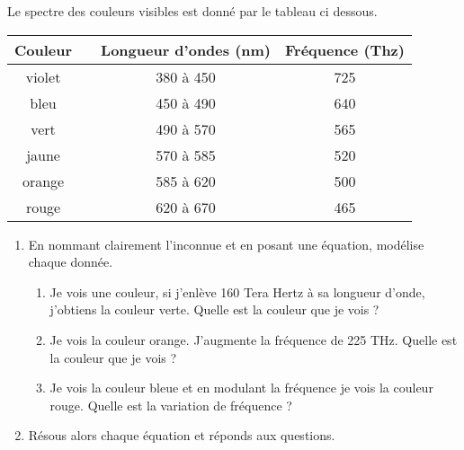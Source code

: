 
Le spectre des couleurs visibles est donné par le tableau ci dessous.

\begin{center}
\begin{tabular}{|c|c|c|c|}
\hline 
Couleur &  & Longueur d'ondes (nm) & Fréquence (Thz)\\ 
\hline 
violet & \cellcolor{purple} & 380 à 450   & 725 \\ 
\hline 
bleu & \cellcolor{blue} & 450 à 490   & 640 \\ 
\hline 
vert & \cellcolor{vert} & 490 à 570   & 565 \\ 
\hline 
jaune & \cellcolor{yellow} & 570 à 585   & 520 \\ 
\hline 
orange & \cellcolor{orange} & 585 à 620   & 500 \\ 
\hline 
rouge & \cellcolor{red} & 620 à 670  & 465 \\ 
\hline 
\end{tabular}
\end{center}
 
\begin{enumerate}
\item En nommant clairement l'inconnue et en posant une équation, modélise chaque donnée.
\begin{enumerate}
\item Je vois une couleur, si j'enlève 160 Tera Hertz à sa  longueur d'onde, j'obtiens la couleur verte. Quelle est la couleur que je vois ?
\item Je vois la couleur orange. J'augmente la fréquence de 225 THz. Quelle est la couleur que je vois ?
\item Je vois la couleur bleue et en modulant la fréquence je vois la couleur rouge. Quelle est la variation de fréquence ?
\end{enumerate}
\item Résous alors chaque équation et réponds aux questions.
\end{enumerate}